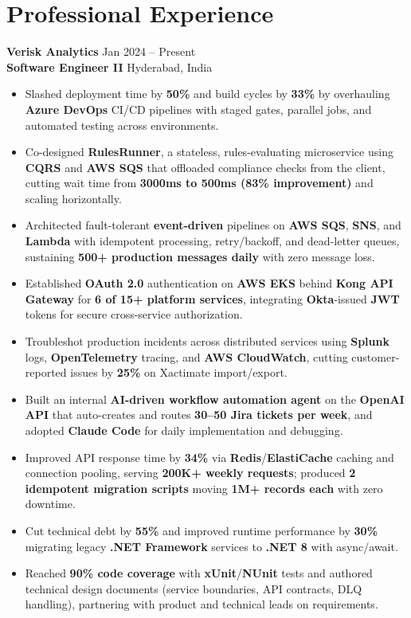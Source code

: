 \documentclass[a4paper,10pt]{article}
\begin{document}
\section*{Professional Experience}

\textbf{Verisk Analytics} \hfill Jan 2024 -- Present \\
\textbf{Software Engineer II} \hfill Hyderabad, India

\begin{itemize}[leftmargin=*]
    \item Slashed deployment time by \textbf{50\%} and build cycles by \textbf{33\%} by overhauling \textbf{Azure DevOps} CI/CD pipelines with staged gates, parallel jobs, and automated testing across environments.
    \item Co-designed \textbf{RulesRunner}, a stateless, rules-evaluating microservice using \textbf{CQRS} and \textbf{AWS SQS} that offloaded compliance checks from the client, cutting wait time from \textbf{3000ms to 500ms (83\% improvement)} and scaling horizontally.
    \item Architected fault-tolerant \textbf{event-driven} pipelines on \textbf{AWS SQS}, \textbf{SNS}, and \textbf{Lambda} with idempotent processing, retry/backoff, and dead-letter queues, sustaining \textbf{500+ production messages daily} with zero message loss.
    \item Established \textbf{OAuth 2.0} authentication on \textbf{AWS EKS} behind \textbf{Kong API Gateway} for \textbf{6 of 15+ platform services}, integrating \textbf{Okta}-issued \textbf{JWT} tokens for secure cross-service authorization.
    \item Troubleshot production incidents across distributed services using \textbf{Splunk} logs, \textbf{OpenTelemetry} tracing, and \textbf{AWS CloudWatch}, cutting customer-reported issues by \textbf{25\%} on Xactimate import/export.
    \item Built an internal \textbf{AI-driven workflow automation agent} on the \textbf{OpenAI API} that auto-creates and routes \textbf{30--50 Jira tickets per week}, and adopted \textbf{Claude Code} for daily implementation and debugging.
    \item Improved API response time by \textbf{34\%} via \textbf{Redis}/\textbf{ElastiCache} caching and connection pooling, serving \textbf{200K+ weekly requests}; produced \textbf{2 idempotent migration scripts} moving \textbf{1M+ records each} with zero downtime.
    \item Cut technical debt by \textbf{55\%} and improved runtime performance by \textbf{30\%} migrating legacy \textbf{.NET Framework} services to \textbf{.NET 8} with async/await.
    \item Reached \textbf{90\% code coverage} with \textbf{xUnit}/\textbf{NUnit} tests and authored technical design documents (service boundaries, API contracts, DLQ handling), partnering with product and technical leads on requirements.
\end{itemize}
\end{document}
